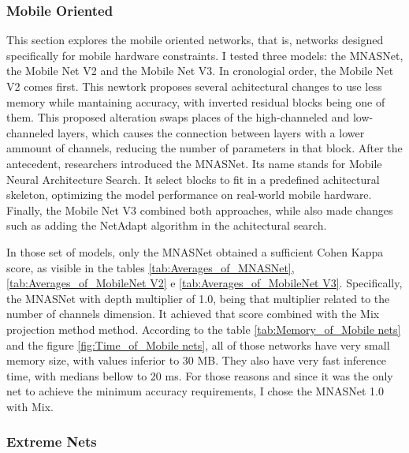 \FloatBarrier

\subsubsection{Mobile Oriented}

This section explores the mobile oriented networks, that is, networks designed specifically for mobile hardware constraints. I tested three models: the MNASNet, the Mobile Net V2 and the Mobile Net V3. In cronologial order, the Mobile Net V2 comes first. This newtork proposes several achitectural changes to use less memory while mantaining accuracy, with inverted residual blocks being one of them. This proposed alteration swaps places of the high-channeled and low-channeled layers, which causes the connection between layers with a lower ammount of channels, reducing the number of parameters in that block. After the antecedent, researchers introduced the MNASNet. Its name stands for Mobile Neural Architecture Search. It select blocks to fit in a predefined achitectural skeleton, optimizing the model performance on real-world mobile hardware. Finally, the Mobile Net V3 combined both approaches, while also made changes such as adding the NetAdapt \cite{NetAdapt} algorithm in the achitectural search.

In those set of models, only the MNASNet obtained a sufficient Cohen Kappa score, as visible in the tables \ref{tab:Averages_of_MNASNet}, \ref{tab:Averages_of_MobileNet V2} e \ref{tab:Averages_of_MobileNet V3}. Specifically, the MNASNet with depth multiplier of 1.0, being that multiplier related to the number of channels dimension. It achieved that score combined with the \gls{Mix} projection method method. According to the table \ref{tab:Memory_of_Mobile nets} and the figure \ref{fig:Time_of_Mobile nets}, all of those networks have very small memory size, with values inferior to 30 MB. They also have very fast inference time, with medians bellow to 20 ms. For those reasons and since it was the only net to achieve the minimum accuracy requirements, I chose the MNASNet 1.0 with \gls{Mix}. 






\FloatBarrier

\subsubsection{Extreme Nets}

